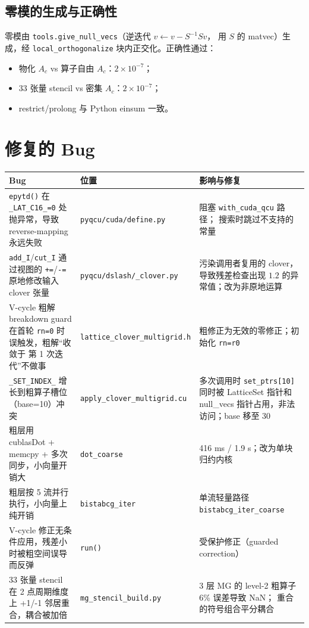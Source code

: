 \documentclass[11pt,a4paper]{article}
\begin{document}
\subsection{零模的生成与正确性}
\label{sec:nullvecs}
零模由 \texttt{tools.give\_null\_vecs}（逆迭代 $v\leftarrow v-S^{-1}Sv$，
用 $S$ 的 matvec）生成，经 \texttt{local\_orthogonalize} 块内正交化。正确性通过：
\begin{itemize}
  \item 物化 $A_c$ vs 算子自由 $A_c$：$2\times10^{-7}$；
  \item 33 张量 stencil vs 密集 $A_c$：$2\times10^{-7}$；
  \item restrict/prolong 与 Python einsum 一致。
\end{itemize}

\section{修复的 Bug}
\label{sec:bugs}

\begin{longtable}{p{4.5cm}p{4cm}p{6cm}}
\toprule
Bug & 位置 & 影响与修复 \\
\midrule
\endhead
\texttt{epytd()} 在 \texttt{\_LAT\_C16\_=0} 处抛异常，导致 reverse-mapping
永远失败 & \texttt{pyqcu/cuda/define.py} & 阻塞 \texttt{with\_cuda\_qcu} 路径；
搜索时跳过不支持的常量 \\
\texttt{add\_I}/\texttt{cut\_I} 通过视图的 \texttt{+=}/\texttt{-=} 原地修改输入
clover 张量 & \texttt{pyqcu/dslash/\_clover.py} & 污染调用者复用的 clover，
导致残差检查出现 $1.2$ 的异常值；改为非原地运算 \\
V-cycle 粗解 breakdown guard 在首轮 \texttt{rn=0} 时误触发，粗解“收敛于
第 1 次迭代”不做事 & \texttt{lattice\_clover\_multigrid.h} &
粗修正为无效的零修正；初始化 \texttt{rn=r0} \\
\texttt{\_SET\_INDEX\_} 增长到粗算子槽位（base=10）冲突 &
\texttt{apply\_clover\_multigrid.cu} & 多次调用时 \texttt{set\_ptrs[10]} 同时被
LatticeSet 指针和 null\_vecs 指针占用，非法访问；base 移至 30 \\
粗层用 cublasDot + memcpy + 多次同步，小向量开销大 &
\texttt{dot\_coarse} & 416 ms / 1.9 s；改为单块归约内核 \\
粗层按 5 流并行执行，小向量上纯开销 & \texttt{bistabcg\_iter} &
单流轻量路径 \texttt{bistabcg\_iter\_coarse} \\
V-cycle 修正无条件应用，残差小时被粗空间误导而反弹 & \texttt{run()} &
受保护修正（guarded correction） \\
33 张量 stencil 在 2 点周期维度上 +1/-1 邻居重合，耦合被加倍 &
\texttt{mg\_stencil\_build.py} & 3 层 MG 的 level-2 粗算子 6\% 误差导致 NaN；
重合的符号组合平分耦合 \\
\bottomrule
\end{longtable}
\end{document}
